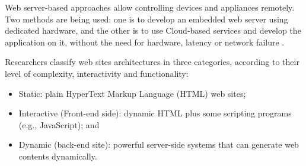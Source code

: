 Web server-based approaches allow controlling devices and appliances remotely. Two methods are being used: one is to develop an embedded web server using dedicated hardware, and  the other is to use Cloud-based services and develop the application on it, without the need for hardware, latency or network failure \cite{attitalla2016}. 

Researchers \cite{tilley2001}  classify web sites architectures in three categories, according to their level of complexity, interactivity and functionality:
\begin{itemize}
\item Static: plain HyperText Markup Language (HTML) web sites;
\item Interactive (Front-end side): dynamic HTML plus some scripting programs (e.g., JavaScript); and
\item Dynamic (back-end site): powerful server-side systems that can generate web contents dynamically.
\end{itemize}

